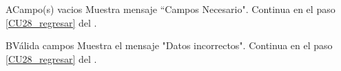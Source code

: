 \begin{UCtrayectoriaA}{A}{Campo(s) vacios}
	\UCpaso Muestra mensaje “Campos Necesario".
	\UCpaso Continua en el paso \ref{CU28_regresar} del .
\end{UCtrayectoriaA}

\begin{UCtrayectoriaA}{B}{Válida campos}
	\UCpaso Muestra el mensaje "Datos incorrectos".
	\UCpaso Continua en el paso \ref{CU28_regresar} del .
\end{UCtrayectoriaA}


	


